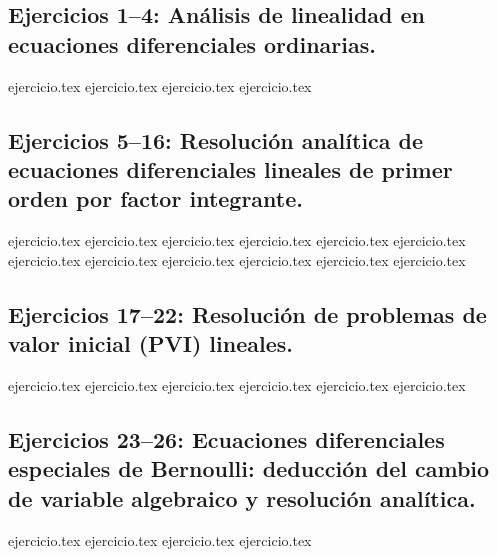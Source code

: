 
\subsection*{Ejercicios 1--4: Análisis de linealidad en ecuaciones diferenciales ordinarias.}
\begin{enumerate}
    {ejercicio.tex}
    {ejercicio.tex}
    {ejercicio.tex}
    {ejercicio.tex}
\end{enumerate}

\subsection*{Ejercicios 5--16: Resolución analítica de ecuaciones diferenciales lineales de primer orden por factor integrante.}
\begin{enumerate}
    \setcounter{enumi}{4}
    {ejercicio.tex}
    {ejercicio.tex}
    {ejercicio.tex}
    {ejercicio.tex}
    {ejercicio.tex}
    {ejercicio.tex}
    {ejercicio.tex}
    {ejercicio.tex}
    {ejercicio.tex}
    {ejercicio.tex}
    {ejercicio.tex}
    {ejercicio.tex}
\end{enumerate}

\subsection*{Ejercicios 17--22: Resolución de problemas de valor inicial (PVI) lineales.}
\begin{enumerate}
    \setcounter{enumi}{16}
    {ejercicio.tex}
    {ejercicio.tex}
    {ejercicio.tex}
    {ejercicio.tex}
    {ejercicio.tex}
    {ejercicio.tex}
\end{enumerate}

\subsection*{Ejercicios 23--26: Ecuaciones diferenciales especiales de Bernoulli: deducción del cambio de variable algebraico y resolución analítica.}
\begin{enumerate}
    \setcounter{enumi}{22}
    {ejercicio.tex}
    {ejercicio.tex}
    {ejercicio.tex}
    {ejercicio.tex}
\end{enumerate}

